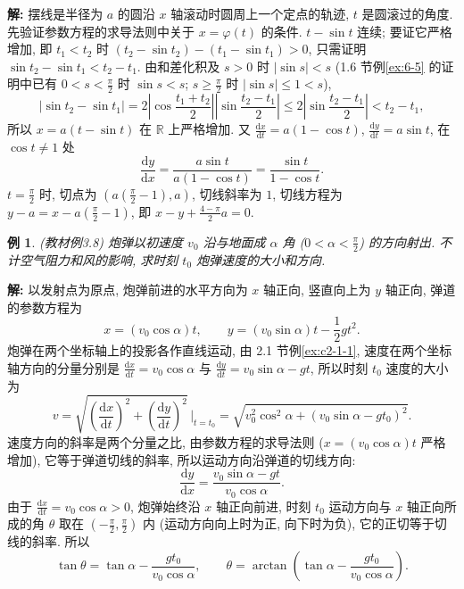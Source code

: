 \documentclass[UTF8,openany]{ctexbook}
\theoremstyle{chinesetextbook}
\newtheorem{example}{例}[section]
\newenvironment{cnsolution}{\par\indent\textbf{解:} \ignorespaces}{\par}
\newcommand{\dd}{\mathrm d}
\begin{document}
\begin{cnsolution}
摆线是半径为 $a$ 的圆沿 $x$ 轴滚动时圆周上一个定点的轨迹, $t$ 是圆滚过的角度. 先验证参数方程的求导法则中关于 $x=\varphi(t)$ 的条件. $t-\sin t$ 连续; 要证它严格增加, 即 $t_1<t_2$ 时 $(t_2-\sin t_2)-(t_1-\sin t_1)>0$, 只需证明 $\sin t_2-\sin t_1<t_2-t_1$. 由和差化积及 $s>0$ 时 $|\sin s|<s$ (1.6 节例\ref{ex:6-5} 的证明中已有 $\displaystyle0<s<\frac\pi2$ 时 $\sin s<s$; $\displaystyle s\ge\frac\pi2$ 时 $|\sin s|\le1<s$),
\[
|\sin t_2-\sin t_1|=2\left|\cos\frac{t_1+t_2}2\right|\left|\sin\frac{t_2-t_1}2\right|\le2\left|\sin\frac{t_2-t_1}2\right|<t_2-t_1,
\]
所以 $x=a(t-\sin t)$ 在 $\mathbb R$ 上严格增加. 又 $\displaystyle\frac{\dd x}{\dd t}=a(1-\cos t)$, $\displaystyle\frac{\dd y}{\dd t}=a\sin t$, 在 $\cos t\ne1$ 处
\[
\frac{\dd y}{\dd x}=\frac{a\sin t}{a(1-\cos t)}=\frac{\sin t}{1-\cos t}.
\]
$\displaystyle t=\frac\pi2$ 时, 切点为 $\displaystyle\left(a\left(\frac\pi2-1\right),a\right)$, 切线斜率为 $1$, 切线方程为 $\displaystyle y-a=x-a\left(\frac\pi2-1\right)$, 即 $\displaystyle x-y+\frac{4-\pi}2a=0$.
\end{cnsolution}
\begin{example}\label{ex:c2-3-8}
\textnormal{(教材例3.8)} 炮弹以初速度 $v_0$ 沿与地面成 $\alpha$ 角 ($\displaystyle0<\alpha<\frac\pi2$) 的方向射出. 不计空气阻力和风的影响, 求时刻 $t_0$ 炮弹速度的大小和方向.
\end{example}
\begin{cnsolution}
以发射点为原点, 炮弹前进的水平方向为 $x$ 轴正向, 竖直向上为 $y$ 轴正向, 弹道的参数方程为
\[
x=(v_0\cos\alpha)t,\qquad y=(v_0\sin\alpha)t-\frac12gt^2.
\]
炮弹在两个坐标轴上的投影各作直线运动, 由 2.1 节例\ref{ex:c2-1-1}, 速度在两个坐标轴方向的分量分别是 $\displaystyle\frac{\dd x}{\dd t}=v_0\cos\alpha$ 与 $\displaystyle\frac{\dd y}{\dd t}=v_0\sin\alpha-gt$, 所以时刻 $t_0$ 速度的大小为
\[
v=\sqrt{\left(\frac{\dd x}{\dd t}\right)^2+\left(\frac{\dd y}{\dd t}\right)^2}\,\Bigg|_{t=t_0}=\sqrt{v_0^2\cos^2\alpha+(v_0\sin\alpha-gt_0)^2}.
\]
速度方向的斜率是两个分量之比, 由参数方程的求导法则 ($x=(v_0\cos\alpha)t$ 严格增加), 它等于弹道切线的斜率, 所以运动方向沿弹道的切线方向:
\[
\frac{\dd y}{\dd x}=\frac{v_0\sin\alpha-gt}{v_0\cos\alpha}.
\]
由于 $\displaystyle\frac{\dd x}{\dd t}=v_0\cos\alpha>0$, 炮弹始终沿 $x$ 轴正向前进, 时刻 $t_0$ 运动方向与 $x$ 轴正向所成的角 $\theta$ 取在 $\displaystyle\left(-\frac\pi2,\frac\pi2\right)$ 内 (运动方向向上时为正, 向下时为负), 它的正切等于切线的斜率. 所以
\[
\tan\theta=\tan\alpha-\frac{gt_0}{v_0\cos\alpha},\qquad\theta=\arctan\left(\tan\alpha-\frac{gt_0}{v_0\cos\alpha}\right).
\]

\end{cnsolution}
\end{document}
